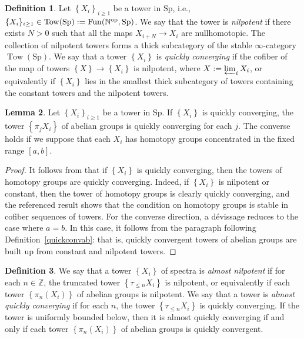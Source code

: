 \documentclass{amsart}
\newcommand{\Sp}{\mathrm{Sp}}
\theoremstyle{definition}
\newtheorem{definition}{Definition}[section]
\newtheorem{lemma}[definition]{Lemma}
\newcommand{\bb}{\mathbb}
\newcommand{\op}{\operatorname}
\newcommand{\sub}[1]{{\mbox{\rm \scriptsize #1}}}
\begin{document}
\begin{definition}
Let $\left\{X_i\right\}_{i \geq 1}$ be a tower in $\Sp$, i.e., $\{X_i\}_{i\ge1}\in\op{Tow}(\Sp):=\op{Fun}(\bb N^\sub{op},\Sp)$. 
We say that the tower is \emph{nilpotent} if there exists $N> 0$ such that all the
maps $X_{i+N} \to X_i$ are nullhomotopic. The collection of nilpotent towers
forms a thick subcategory of the stable $\infty$-category $\op{Tow}(\Sp)$. 
We say that a tower $\left\{X_i\right\}$ is \emph{quickly converging}
if the cofiber of the map of towers $\left\{X\right\}
\to \left\{X_i\right\}$ is nilpotent, where $X:=\varprojlim_iX_i$, or equivalently if $\left\{X_i\right\}$ lies in the smallest thick subcategory of towers containing the constant towers and the nilpotent towers.
\end{definition} 


\begin{lemma}
Let $\left\{X_i\right\}_{i\ge1}$ be a tower in $\Sp$.
 If $\left\{X_i\right\}$ is quickly converging,  the
tower $\left\{\pi_j X_i\right\}$ of abelian groups is quickly converging for each $j$. 
The converse holds 
if we suppose that each $X_i$ has homotopy groups concentrated in the fixed range
$[a,b]$.
\end{lemma} 
\begin{proof} 
It follows from \cite[Lemma 3.11]{Mthick} that if $\left\{X_i\right\}$ is
quickly converging, then the towers of homotopy groups are 
quickly converging. 
Indeed, if $\left\{X_i\right\}$ is nilpotent or constant, then the tower of
homotopy groups is clearly quickly converging, and the referenced result shows
that the condition on homotopy groups is stable in cofiber sequences of towers. 
For the converse direction, a d\'evissage reduces to the
case where $a= b$. In this case, it follows from the paragraph following 
Definition~\ref{quickconvab}: that is, quickly convergent towers of abelian
groups are built up from constant and nilpotent towers. 
\end{proof} 

\begin{definition} 
We say that a tower $\left\{X_i\right\}$ of spectra  is \emph{almost nilpotent}
if for each $n \in \mathbb{Z}$, the truncated tower $\left\{\tau_{\leq n}
X_i\right\}$ is nilpotent, or equivalently if each tower $\left\{\pi_n
(X_i)\right\}$ of abelian groups is nilpotent. We say that a tower is \emph{almost quickly
converging} if for each $n$, the tower $\left\{\tau_{\leq n} X_i\right\}$ is
quickly converging. If the tower is uniformly bounded below, then it is almost
quickly converging if 
and only  if each tower $\left\{\pi_n
(X_i)\right\}$ of abelian groups is quickly convergent.  
\end{definition} 
\end{document}
